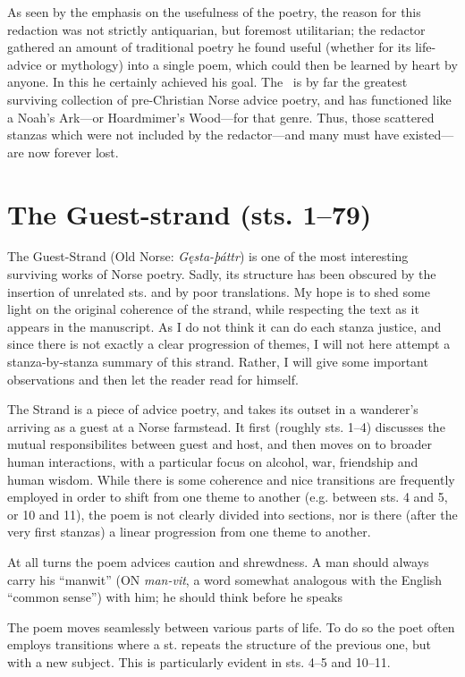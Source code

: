 As seen by the emphasis on the usefulness of the poetry, the reason for this redaction was not strictly antiquarian, but foremost utilitarian; the redactor gathered an amount of traditional poetry he found useful (whether for its life-advice or mythology) into a single poem, which could then be learned by heart by anyone.  In this he certainly achieved his goal.  The \Havamal\ is by far the greatest surviving collection of pre-Christian Norse advice poetry, and has functioned like a Noah’s Ark—or Hoardmimer’s Wood—for that genre.  Thus, those scattered stanzas which were not included by the redactor—and many must have existed—are now forever lost.

\sectionline

\section{The Guest-strand (sts. 1–79)}

The Guest-Strand (Old Norse: \emph{Gęsta-þáttr}) is one of the most interesting surviving works of Norse poetry.  Sadly, its structure has been obscured by the insertion of unrelated sts. and by poor translations.  My hope is to shed some light on the original coherence of the strand, while respecting the text as it appears in the manuscript.  As I do not think it can do each stanza justice, and since there is not exactly a clear progression of themes, I will not here attempt a stanza-by-stanza summary of this strand. Rather, I will give some important observations and then let the reader read for himself.

The Strand is a piece of advice poetry, and takes its outset in a wanderer’s arriving as a guest at a Norse farmstead.  It first (roughly sts. 1–4) discusses the mutual responsibilites between guest and host, and then moves on to broader human interactions, with a particular focus on alcohol, war, friendship and human wisdom.  While there is some coherence and nice transitions are frequently employed in order to shift from one theme to another (e.g. between sts. 4 and 5, or 10 and 11), the poem is not clearly divided into sections, nor is there (after the very first stanzas) a linear progression from one theme to another.

At all turns the poem advices caution and shrewdness.  A man should always carry his “manwit” (ON \emph{man-vit}, a word somewhat analogous with the English “common sense”) with him; he should think before he speaks

The poem moves seamlessly between various parts of life.  To do so the poet often employs transitions where a st. repeats the structure of the previous one, but with a new subject.  This is particularly evident in sts. 4–5 and 10–11.

